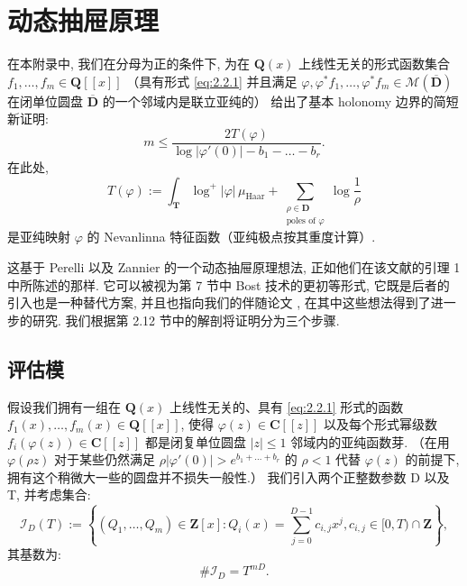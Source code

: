 \section{动态抽屉原理}\label{sec:B}

在本附录中, 我们在分母为正的条件下, 
为在 \(\mathbf{Q}(x)\) 上线性无关的形式函数集合 \(f_1, \ldots, f_m \in \mathbf{Q}[\![x]\!]\) 
（具有形式 \eqref{eq:2.2.1} 并且满足 \(\varphi, \varphi^* f_1, \ldots, \varphi^* f_m \in \mathcal{M}(\overline{\mathbf{D}})\) 
在闭单位圆盘 \(\overline{\mathbf{D}}\) 的一个邻域内是联立亚纯的） 
给出了基本 holonomy 边界的简短新证明:
\begin{equation}\label{eq:B.0.1}
m \le \frac{2T(\varphi)}{\log|\varphi'(0)| - b_1 - \dots - b_r}.
\end{equation}
在此处,
\begin{equation}\label{eq:B.0.2}
T(\varphi) := \int_{\mathbf{T}} \log^{+} |\varphi| \, \mu_{\text{Haar}} + \sum_{\substack{\rho \in \mathbf{D} \\ \text{poles of } \varphi}} \log \frac{1}{\rho}
\end{equation}
是亚纯映射 \(\varphi\) 的 Nevanlinna 特征函数（亚纯极点按其重度计算）.

这基于 Perelli 以及 Zannier \cite{PZ84} 的一个动态抽屉原理想法, 
正如他们在该文献的引理 1 中所陈述的那样. 
它可以被视为第 7 节中 Bost 技术的更初等形式, 
它既是后者的引入也是一种替代方案, 
并且也指向我们的伴随论文 \cite{CDT24}, 
在其中这些想法得到了进一步的研究. 
我们根据第 2.12 节中的解剖将证明分为三个步骤.

\subsection{评估模}\label{sec:B.1}

假设我们拥有一组在 \(\mathbf{Q}(x)\) 上线性无关的、具有 \eqref{eq:2.2.1} 形式的函数 \(f_1(x), \dots, f_m(x) \in \mathbf{Q}[\![x]\!]\), 
使得 \(\varphi(z) \in \mathbf{C}[\![z]\!]\) 以及每个形式幂级数 \(f_i(\varphi(z)) \in \mathbf{C}[\![z]\!]\) 
都是闭复单位圆盘 \(|z| \le 1\) 邻域内的亚纯函数芽. 
（在用 \(\varphi(\rho z)\) 对于某些仍然满足 \(\rho|\varphi'(0)| > e^{b_1 + \dots + b_r}\) 的 \(\rho < 1\) 
代替 \(\varphi(z)\) 的前提下, 
拥有这个稍微大一些的圆盘并不损失一般性.） 
我们引入两个正整数参数 D 以及 T, 
并考虑集合:
\begin{equation}\label{eq:B.1.1}
\mathcal{I}_D(T) := \left\{ (Q_1, \dots, Q_m) \in \mathbf{Z}[x] : Q_i(x) = \sum_{j=0}^{D-1} c_{i,j} x^j, c_{i,j} \in [0, T) \cap \mathbf{Z} \right\},
\end{equation}
其基数为:
\begin{equation}\label{eq:B.1.2}
\#\mathcal{I}_D = T^{mD}.
\end{equation}

